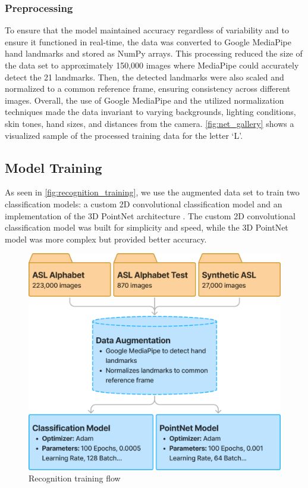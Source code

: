 \documentclass[../paper.tex]{subfiles}
\begin{document}
\subsubsection*{Preprocessing}
To ensure that the model maintained accuracy regardless of variability and to ensure it functioned in real-time, the data was converted to Google MediaPipe \cite{MediaPipe} hand landmarks and stored as NumPy \cite{numpy} arrays. This processing reduced the size of the data set to approximately 150,000 images where MediaPipe could accurately detect the 21 landmarks. Then, the detected landmarks were also scaled and normalized to a common reference frame, ensuring consistency across different images. Overall, the use of Google MediaPipe and the utilized normalization techniques made the data invariant to varying backgrounds, lighting conditions, skin tones, hand sizes, and distances from the camera. \autoref{fig:net_gallery} shows a visualized sample of the processed training data for the letter \lq L\rq.

\subsection{Model Training}

As seen in \autoref{fig:recognition_training}, we use the augmented data set to train two classification models: a custom 2D convolutional classification model and an implementation of the 3D PointNet architecture \cite{PointNet}. The custom 2D convolutional classification model was built for simplicity and speed, while the 3D PointNet model was more complex but provided better accuracy.

\begin{figure}[!htbp]
  \centerline{\includegraphics[width=\linewidth]{../figures/recognition-training.png}}
  \caption{Recognition training flow}\label{fig:recognition_training}
\end{figure}
\end{document}
